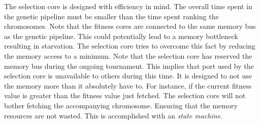 The selection core is designed with efficiency in mind.
The overall time spent in the genetic pipeline must be smaller than the time spent ranking the chromosomes.
Note that the fitness cores are connected to the same memory bus as the genetic pipeline.
This could potentially lead to a memory bottleneck resulting in starvation.
The selection core tries to overcome this fact by reducing the memory access to a minimum.
Note that the selection core has reserved the memory bus during the ongoing tournament.
This implies that port used by the selection core is unavailable to others during this time.
It is designed to not use the memory more than it absolutely have to.
For instance, if the current fitness value is greater than the fitness value just fetched.
The selection core will not bother fetching the accompanying chromosome.
Ensuring that the memory resources are not wasted.
This is accomplished with an \emph{state machine}. 




















